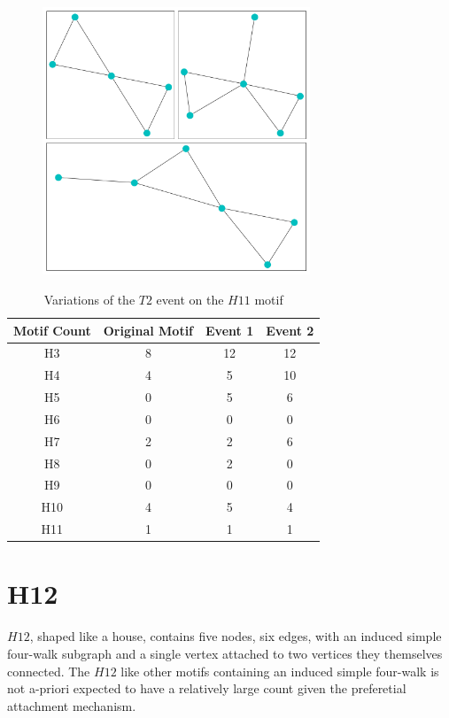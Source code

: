 \begin{figure}[!ht]
    \includegraphics[width=8cm]{Images/H11_evolution.png}
    \centering
\end{figure}

\begin{table}
    \centering
    \begin{tabular}{||c c c c||} 
    \hline
    Motif Count & Original Motif & Event 1 & Event 2 \\ [0.5ex] 
    \hline\hline
    H3 & 8 & 12 & 12 \\ 
    \hline
    H4 & 4 & 5 & 10  \\
    \hline
    H5 & 0 & 5 & 6  \\
    \hline
    H6 & 0 & 0 & 0  \\
    \hline
    H7 & 2 & 2 & 6 \\
    \hline
    H8 & 0 & 2 & 0 \\
    \hline
    H9 & 0 & 0 & 0 \\
    \hline
    H10 & 4 & 5 & 4 \\
    \hline
    H11 & 1 & 1 & 1\\
    \hline
   \end{tabular}
   \caption{Variations of the $T2$ event on the $H11$ motif}
   \label{table:9}
\end{table}

\FloatBarrier

\section{H12}
$H12$, shaped like a house, contains five nodes, six edges, with an induced simple four-walk subgraph
and a single vertex attached to two vertices they themselves connected. The $H12$ like other
motifs containing an induced simple four-walk is not a-priori expected to have a relatively large count
given the preferetial attachment mechanism. 

